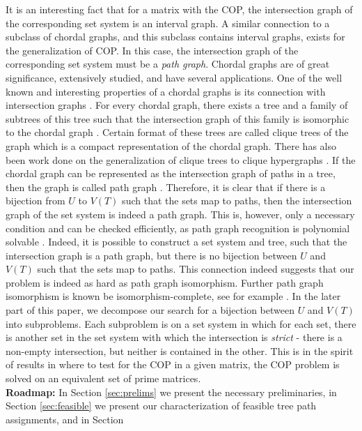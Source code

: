 \documentclass{fsttcs}
\begin{document}
\noindent
It is an interesting fact that for a matrix with the COP, the
intersection graph of the corresponding set system is an interval
graph.  A similar connection to a subclass of chordal graphs, and this
subclass contains interval graphs, exists for the generalization of
COP.  In this case, the intersection graph of the corresponding set
system must be a {\em path graph}. Chordal graphs are of great
significance, extensively studied, and have several applications.  One
of the well known and interesting properties of a chordal graphs is
its connection with intersection graphs \cite{mcg04}. For every chordal
graph, there exists a tree and a family of subtrees of this tree such
that the intersection graph of this family is isomorphic to the
chordal graph \cite{plr70,gav78,bp93}.  Certain format of these trees
are called clique trees \cite{apy92} of the graph which is a compact
representation of the chordal graph. There has also been work done on
the generalization of clique trees to clique hypergraphs \cite{km02}.
If the chordal graph can be represented as the intersection graph of
paths in a tree, then the graph is called path graph \cite{mcg04}.
Therefore, it is clear that if there is a bijection from $U$ to $V(T)$
such that the sets map to paths, then the intersection graph of the
set system is indeed a path graph.  This is, however, only a necessary
condition and can be checked efficiently, as path graph recognition is
polynomial solvable \cite{gav78,aas93}.  Indeed, it is possible to
construct a set system and tree, such that the intersection graph is a
path graph, but there is no bijection between $U$ and $V(T)$ such that
the sets map to paths.  This connection indeed suggests that our
problem is indeed as hard as path graph isomorphism.  Further path
graph isomorphism is known be isomorphism-complete, see for example
\cite{kklv10}.  In the later part of this paper, we decompose our
search for a bijection between $U$ and $V(T)$ into subproblems.  Each
subproblem is on a set system in which for each set, there is another
set in the set system with which the intersection is {\em strict} -
there is a non-empty intersection, but neither is contained in the
other.  This is in the spirit of results in \cite{wlh02,nsnrs09} where
to test for the COP in a given matrix, the COP problem is solved on an
equivalent set of prime matrices.  \\
{\bf Roadmap:} In Section \ref{sec:prelims} we present the
necessary preliminaries, in Section \ref{sec:feasible} we present our
characterization of feasible tree path assignments, and in Section
\end{document}
